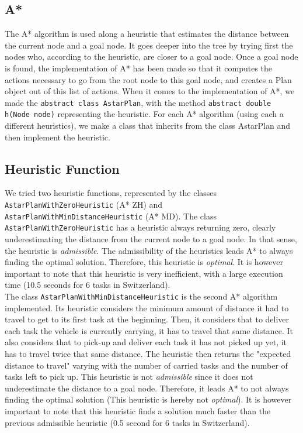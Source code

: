 \documentclass[11pt]{article}
\begin{document}
\subsection{A*}
The A* algorithm is used along a heuristic that estimates the distance between the current node and a goal node. It goes deeper into the tree by trying first the nodes who, according to the heuristic, are closer to a goal node. Once a goal node is found, the implementation of A* has been made so that it computes the actions necessary to go from the root node to this goal node, and creates a Plan object out of this list of actions. When it comes to the implementation of A*, we made the \texttt{abstract class AstarPlan}, with the method \texttt{abstract double h(Node node)} representing the heuristic. For each A* algorithm (using each a different heuristics), we make a class that inherits from\textsl{} the class AstarPlan and then implement the heuristic. 

\subsection{Heuristic Function}
We tried two heuristic functions, represented by the classes \texttt{AstarPlanWithZeroHeuristic} (A* ZH) and \texttt{AstarPlanWithMinDistanceHeuristic} (A* MD). The class \texttt{AstarPlanWithZeroHeuristic} has a heuristic always returning zero, clearly underestimating the distance from the current node to a goal node. In that sense, the heuristic is \textit{admissible}. The admissibility of the heuristics leads A* to always finding the optimal solution. Therefore, this heuristic is \textit{optimal}. It is however important to note that this heuristic is very inefficient, with a large execution time (10.5 seconds for 6 tasks in Switzerland).\\

The class \texttt{AstarPlanWithMinDistanceHeuristic} is the second A* algorithm implemented. Its heuristic considers the minimum amount of distance it had to travel to get to its first task at the beginning. Then, it considers that to deliver each task the vehicle is currently carrying, it has to travel that same distance. It also considers that to pick-up and deliver each task it has not picked up yet, it has to travel twice that same distance. The heuristic then returns the "expected distance to travel" varying with the number of carried tasks and the number of tasks left to pick up. This heuristic is not \textit{admissible} since it does not underestimate the distance to a goal node. Therefore, it leads A* to not always finding the optimal solution (This heuristic is hereby not \textit{optimal}). It is however important to note that this heuristic finds a solution much faster than the previous admissible heuristic (0.5 second for 6 tasks in Switzerland).
\end{document}
